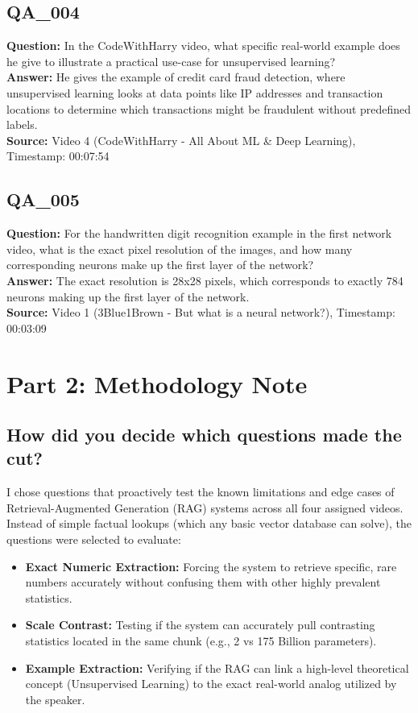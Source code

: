 \documentclass[12pt,a4paper]{article}
\begin{document}
\subsection*{QA\_004}
\textbf{Question:} In the CodeWithHarry video, what specific real-world example does he give to illustrate a practical use-case for unsupervised learning?\\
\textbf{Answer:} He gives the example of credit card fraud detection, where unsupervised learning looks at data points like IP addresses and transaction locations to determine which transactions might be fraudulent without predefined labels.\\
\textbf{Source:} Video 4 (CodeWithHarry - All About ML \& Deep Learning), Timestamp: 00:07:54

\subsection*{QA\_005}
\textbf{Question:} For the handwritten digit recognition example in the first network video, what is the exact pixel resolution of the images, and how many corresponding neurons make up the first layer of the network?\\
\textbf{Answer:} The exact resolution is 28x28 pixels, which corresponds to exactly 784 neurons making up the first layer of the network.\\
\textbf{Source:} Video 1 (3Blue1Brown - But what is a neural network?), Timestamp: 00:03:09

\section*{Part 2: Methodology Note}

\subsection*{How did you decide which questions made the cut?}
I chose questions that proactively test the known limitations and edge cases of Retrieval-Augmented Generation (RAG) systems across all four assigned videos. Instead of simple factual lookups (which any basic vector database can solve), the questions were selected to evaluate:
\begin{itemize}[noitemsep]
    \item \textbf{Exact Numeric Extraction:} Forcing the system to retrieve specific, rare numbers accurately without confusing them with other highly prevalent statistics.
    \item \textbf{Scale Contrast:} Testing if the system can accurately pull contrasting statistics located in the same chunk (e.g., 2 vs 175 Billion parameters).
    \item \textbf{Example Extraction:} Verifying if the RAG can link a high-level theoretical concept (Unsupervised Learning) to the exact real-world analog utilized by the speaker.
\end{itemize}
\end{document}

